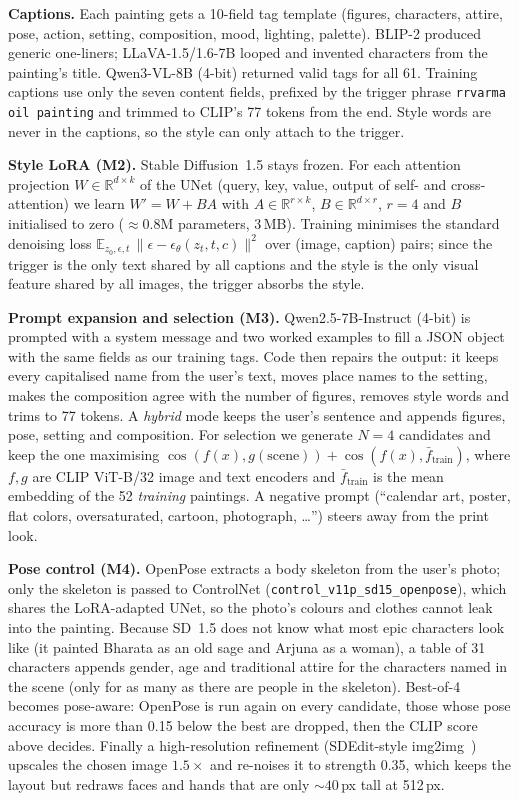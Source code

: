 \documentclass[11pt,a4paper,twocolumn]{article}
\begin{document}
\textbf{Captions.} Each painting gets a 10-field tag template (figures, characters, attire, pose, action,
setting, composition, mood, lighting, palette). BLIP-2 produced generic one-liners; LLaVA-1.5/1.6-7B looped
and invented characters from the painting's title. Qwen3-VL-8B (4-bit) returned valid tags for all 61.
Training captions use only the seven content fields, prefixed by the trigger phrase
\texttt{rrvarma oil painting} and trimmed to CLIP's 77 tokens from the end. Style words are never in the
captions, so the style can only attach to the trigger.

\textbf{Style LoRA (M2).} Stable Diffusion~1.5 stays frozen. For each attention projection
$W\in\mathbb{R}^{d\times k}$ of the UNet (query, key, value, output of self- and cross-attention) we learn
$W' = W + BA$ with $A\in\mathbb{R}^{r\times k}$, $B\in\mathbb{R}^{d\times r}$, $r=4$ and $B$ initialised to
zero (${\approx}0.8$M parameters, 3\,MB). Training minimises the standard denoising loss
$\mathbb{E}_{z_0,\epsilon,t}\,\lVert \epsilon - \epsilon_\theta(z_t, t, c)\rVert^2$ over (image, caption)
pairs; since the trigger is the only text shared by all captions and the style is the only visual feature
shared by all images, the trigger absorbs the style.

\textbf{Prompt expansion and selection (M3).} Qwen2.5-7B-Instruct (4-bit) is prompted with a system message
and two worked examples to fill a JSON object with the same fields as our training tags. Code then repairs
the output: it keeps every capitalised name from the user's text, moves place names to the setting, makes
the composition agree with the number of figures, removes style words and trims to 77 tokens. A
\emph{hybrid} mode keeps the user's sentence and appends figures, pose, setting and composition. For
selection we generate $N{=}4$ candidates and keep the one maximising
$\cos(f(x), g(\text{scene})) + \cos(f(x), \bar{f}_{\text{train}})$, where $f,g$ are CLIP ViT-B/32 image and
text encoders and $\bar{f}_{\text{train}}$ is the mean embedding of the 52 \emph{training} paintings. A
negative prompt (``calendar art, poster, flat colors, oversaturated, cartoon, photograph, \ldots'') steers
away from the print look.

\textbf{Pose control (M4).} OpenPose extracts a body skeleton from the user's photo; only the skeleton is
passed to ControlNet (\texttt{control\_v11p\_sd15\_openpose}), which shares the LoRA-adapted UNet, so the
photo's colours and clothes cannot leak into the painting. Because SD~1.5 does not know what most epic
characters look like (it painted Bharata as an old sage and Arjuna as a woman), a table of 31 characters
appends gender, age and traditional attire for the characters named in the scene (only for as many as there
are people in the skeleton). Best-of-4 becomes pose-aware: OpenPose is run again on every candidate, those
whose pose accuracy is more than 0.15 below the best are dropped, then the CLIP score above decides.
Finally a high-resolution refinement (SDEdit-style img2img~\cite{meng2022sdedit}) upscales the chosen image
$1.5\times$ and re-noises it to strength 0.35, which keeps the layout but redraws faces and hands that are
only ${\sim}40$\,px tall at 512\,px.
\end{document}
